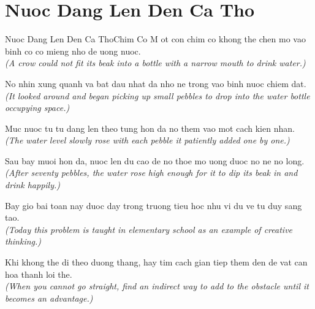 \section{Nuoc Dang Len Den Ca Tho}
\begin{truyen}{Nuoc Dang Len Den Ca Tho}{Chim Co}
M ot con chim co khong the chen mo vao binh co co mieng nho de uong nuoc.\\
\textit{(A crow could not fit its beak into a bottle with a narrow mouth to drink water.)}

No nhin xung quanh va bat dau nhat da nho ne trong vao binh nuoc chiem dat.\\
\textit{(It looked around and began picking up small pebbles to drop into the water bottle occupying space.)}

Muc nuoc tu tu dang len theo tung hon da no them vao mot cach kien nhan.\\
\textit{(The water level slowly rose with each pebble it patiently added one by one.)}

Sau bay muoi hon da, nuoc len du cao de no thoe mo uong duoc no ne no long.\\
\textit{(After seventy pebbles, the water rose high enough for it to dip its beak in and drink happily.)}

Bay gio bai toan nay duoc day trong truong tieu hoc nhu vi du ve tu duy sang tao.\\
\textit{(Today this problem is taught in elementary school as an example of creative thinking.)}

\end{truyen}
\begin{baihoc}
  Khi khong the di theo duong thang, hay tim cach gian tiep them den de vat can hoa thanh loi the.\\
  \textit{(When you cannot go straight, find an indirect way to add to the obstacle until it becomes an advantage.)}
\end{baihoc}

